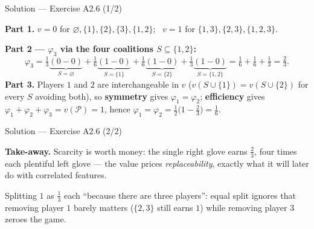 \documentclass[aspectratio=169,11pt]{beamer}
\begin{document}
\begin{frame}{Solution --- Exercise A2.6 (1/2)}
\begin{solutionbox}
  \textbf{Part 1.} $v=0$ for $\varnothing,\{1\},\{2\},\{3\},\{1,2\}$; \
  $v=1$ for $\{1,3\},\{2,3\},\{1,2,3\}$.

  \smallskip
  \textbf{Part 2 --- $\varphi_3$ via the four coalitions $S\subseteq\{1,2\}$:}
  \[
    \varphi_3 = \tfrac13\underbrace{(0-0)}_{S=\varnothing}
              + \tfrac16\underbrace{(1-0)}_{S=\{1\}}
              + \tfrac16\underbrace{(1-0)}_{S=\{2\}}
              + \tfrac13\underbrace{(1-0)}_{S=\{1,2\}}
    = \tfrac16+\tfrac16+\tfrac13 = \tfrac{2}{3}.
  \]
  \textbf{Part 3.} Players $1$ and $2$ are interchangeable in $v$
  ($v(S\cup\{1\})=v(S\cup\{2\})$ for every $S$ avoiding both), so
  \textbf{symmetry} gives $\varphi_1=\varphi_2$; \textbf{efficiency} gives
  $\varphi_1+\varphi_2+\varphi_3 = v(\mathcal{P})=1$, hence
  $\varphi_1=\varphi_2=\tfrac{1}{2}\bigl(1-\tfrac23\bigr)=\tfrac16$.
\end{solutionbox}
\end{frame}

\begin{frame}{Solution --- Exercise A2.6 (2/2)}
\begin{solutionbox}
  \smallskip
  \textbf{Take-away.} Scarcity is worth money: the single right glove earns
  $\tfrac23$, four times each plentiful left glove --- the value prices
  \emph{replaceability}, exactly what it will later do with correlated features.
\end{solutionbox}
\begin{mistake}
  Splitting $1$ as $\tfrac13$ each ``because there are three players'': equal split
  ignores that removing player $1$ barely matters ($\{2,3\}$ still earns $1$) while
  removing player $3$ zeroes the game.
\end{mistake}
\end{frame}
\end{document}
